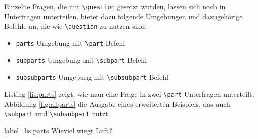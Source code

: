 Einzelne Fragen, die mit \texttt{\textbackslash question} gesetzt wurden, lassen sich noch in Unterfragen unterteilen. 
 bietet dazu folgende Umgebungen und dazugehörige Befehle an, die wie \texttt{\textbackslash question} zu nutzen sind:

\begin{itemize}
	\item \texttt{parts} Umgebung mit \texttt{\textbackslash part} Befehl
	\item \texttt{subparts} Umgebung mit \texttt{\textbackslash subpart} Befehl
	\item \texttt{subsubparts} Umgebung mit \texttt{\textbackslash subsubpart} Befehl
\end{itemize}

Listing \ref{lis:parts} zeigt, wie man eine Frage in zwei \texttt{\textbackslash part} Unterfragen unterteilt, Abbildung \ref{fig:allparts} die Ausgabe eines erweiterten Beispiels, das auch \texttt{\textbackslash subpart} und \texttt{\textbackslash subsubpart} nutzt.

\begin{lfgwcode}{label={lis:parts}}
\question[5]
Wieviel wiegt Luft?

\end{lfgwcode}



